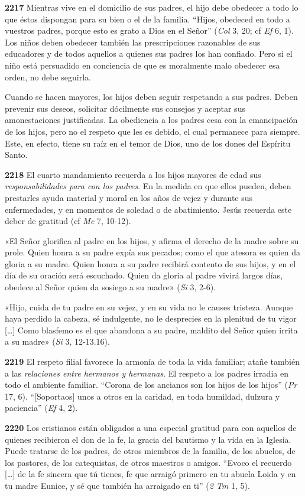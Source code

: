 \documentclass[]{article}
\begin{document}
\textbf{2217} Mientras vive en el domicilio de sus padres, el hijo debe
obedecer a todo lo que éstos dispongan para su bien o el de la familia.
``Hijos, obedeced en todo a vuestros padres, porque esto es grato a Dios
en el Señor'' (\emph{Col} 3, 20; cf \emph{Ef} 6, 1). Los niños deben
obedecer también las prescripciones razonables de sus educadores y de
todos aquellos a quienes sus padres los han confiado. Pero si el niño
está persuadido en conciencia de que es moralmente malo obedecer esa
orden, no debe seguirla.

Cuando se hacen mayores, los hijos deben seguir respetando a sus padres.
Deben prevenir sus deseos, solicitar dócilmente sus consejos y aceptar
sus amonestaciones justificadas. La obediencia a los padres cesa con la
emancipación de los hijos, pero no el respeto que les es debido, el cual
permanece para siempre. Este, en efecto, tiene su raíz en el temor de
Dios, uno de los dones del Espíritu Santo.

\textbf{2218} El cuarto mandamiento recuerda a los hijos mayores de edad
sus \emph{responsabilidades para con los padres}. En la medida en que
ellos pueden, deben prestarles ayuda material y moral en los años de
vejez y durante sus enfermedades, y en momentos de soledad o de
abatimiento. Jesús recuerda este deber de gratitud (cf \emph{Mc} 7,
10-12).

«El Señor glorifica al padre en los hijos, y afirma el derecho de la
madre sobre su prole. Quien honra a su padre expía sus pecados; como el
que atesora es quien da gloria a su madre. Quien honra a su padre
recibirá contento de sus hijos, y en el día de su oración será
escuchado. Quien da gloria al padre vivirá largos días, obedece al Señor
quien da sosiego a su madre» (\emph{Si} 3, 2-6).

«Hijo, cuida de tu padre en su vejez, y en su vida no le causes
tristeza. Aunque haya perdido la cabeza, sé indulgente, no le desprecies
en la plenitud de tu vigor [\ldots{}] Como blasfemo es el que abandona a
su padre, maldito del Señor quien irrita a su madre» (\emph{Si} 3,
12-13.16).

\textbf{2219} El respeto filial favorece la armonía de toda la vida
familiar; atañe también a las \emph{relaciones entre hermanos y
hermanas}. El respeto a los padres irradia en todo el ambiente familiar.
``Corona de los ancianos son los hijos de los hijos'' (\emph{Pr} 17, 6).
``{[}Soportaos{]} unos a otros en la caridad, en toda humildad, dulzura
y paciencia'' (\emph{Ef} 4, 2).

\textbf{2220} Los cristianos están obligados a una especial gratitud
para con aquellos de quienes recibieron el don de la fe, la gracia del
bautismo y la vida en la Iglesia. Puede tratarse de los padres, de otros
miembros de la familia, de los abuelos, de los pastores, de los
catequistas, de otros maestros o amigos. ``Evoco el recuerdo [\ldots{}]
de la fe sincera que tú tienes, fe que arraigó primero en tu abuela
Loida y en tu madre Eunice, y sé que también ha arraigado en ti''
(\emph{2 Tm} 1, 5).
\end{document}
